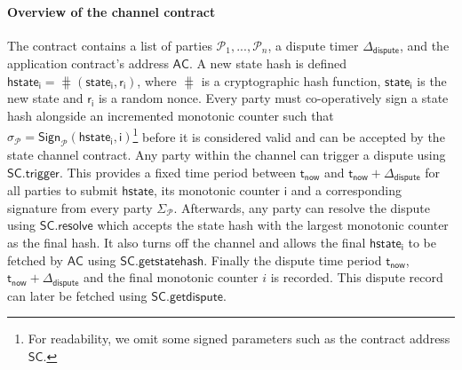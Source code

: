 \documentclass{llncs}
\newcommand{\cmd}{\mathsf{cmd}}
\newcommand{\hstate}{\mathsf{hstate}}
\newcommand{\hstatei}{\mathsf{hstate}_{\monotoniccounter}}
\newcommand{\hstateplus}{\ensuremath{\mathsf{hstate}_{\monotoniccounter+1}}}
\newcommand{\monotoniccounter}{\mathsf{i}}
\newcommand{\stateinfoi}{\mathsf{state}_{\mathsf{i}}}
\newcommand{\stateinfoplus}{\mathsf{state}_{\mathsf{i+1}}}
\newcommand{\participant}{\mathcal{P}}
\newcommand{\rani}{\mathsf{r}_{\mathsf{i}}}
\newcommand{\statechannel}{\mathsf{SC}}
\newcommand{\statechanneldispute}{\mathsf{SC}.\mathsf{trigger}}
\newcommand{\statechannelresolve}{\mathsf{SC}.\mathsf{resolve}}
\newcommand{\statechannelgetcommitment}{\mathsf{SC}.\mathsf{getstatehash}}
\newcommand{\statechannelgetdispute}{\mathsf{SC}.\mathsf{getdispute}}
\newcommand{\sign}{\mathsf{Sign}}
\newcommand{\appcontract}{\mathsf{AC}}
\newcommand{\timerdispute}{\mathsf{\Delta}_{\mathsf{dispute}}}
\newcommand{\timenow}{\mathsf{t}_{\mathsf{now}}}
\newcommand{\timedispute}{\timenow + \mathsf{\Delta}_{\mathsf{dispute}}}
\begin{document}
\paragraph{Overview of the channel contract} 
The contract contains a list of parties $\participant_{1},...,\participant_{n}$, a dispute timer $\timerdispute$, and the application contract's address $\appcontract$. 
A new state hash is defined $\hstatei = \hash(\stateinfoi, \rani)$, where $\hash$ is a cryptographic hash function, $\stateinfoi$ is the new state and $\rani$ is a random nonce.
Every party must co-operatively sign a state hash alongside an incremented monotonic counter such that $\sigma_{\participant} = \sign_{\participant}(\hstatei, \monotoniccounter)$\footnote{For readability, we omit some signed parameters such as the contract address $\statechannel$.} before it is considered valid and can be accepted by the state channel contract. 
Any party within the channel can trigger a dispute using $\statechanneldispute$.
This provides a fixed time period between $\timenow$ and $\timedispute$ for all parties to submit $\hstate$, its monotonic counter $\monotoniccounter$ and a corresponding signature from every party $\Sigma_{\participant}$. 
Afterwards, any party can resolve the dispute using $\statechannelresolve$ which accepts the state hash with the largest monotonic counter as the final hash.
It also turns off the channel and allows the final $\hstatei$ to be fetched by $\appcontract$ using  $\statechannelgetcommitment$. 
Finally the dispute time period $\timenow$, $\timedispute$ and the final monotonic counter $i$ is recorded.
This dispute record can later be fetched using $\statechannelgetdispute$. 
%
%
\end{document}
